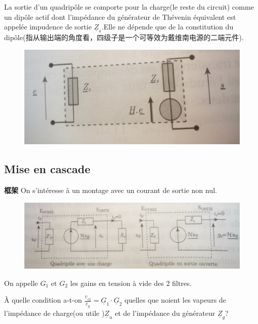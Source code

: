 \documentclass[12pt]{book}
\theoremstyle{definition}\newtheorem{dfn}{Définition}[chapter]
\theoremstyle{plain}\newtheorem{thm}{Théorème}[chapter]
\theoremstyle{plain}\newtheorem{prp}{Proposition}[chapter]
\theoremstyle{plain}\newtheorem{lem}{\bf Lemme}[chapter]
\theoremstyle{plain}\newtheorem{axm}{\bf Axiome}[chapter]
\theoremstyle{plain}\newtheorem{lmm}{\bf Lemme}[chapter]
\theoremstyle{plain}\newtheorem{cor}{\bf Corollaire}[chapter]
\theoremstyle{remark}\newtheorem{rem}{Remarque}[chapter]
\begin{document}
La sortie d'un quadripôle se comporte pour la charge(le reste du circuit) comme un dipôle actif dont l'impédance du générateur de Thévenin équivalent est appelée impudence de sortie $\underline{Z}_s$.Elle ne dépende que de la constitution du dipôle(指从输出端的角度看，四级子是一个可等效为戴维南电源的二端元件).
\begin{figure}[H]
	\centering
	\includegraphics[scale=0.15]{image//Filtrage//11}
\end{figure}
\subsection{Mise en cascade}
\begin{framed}{\textbf{框架}}
 On s'intéresse à un montage avec un courant de sortie non nul.
\end{framed}
\begin{figure}[H]
	\centering
	\includegraphics[scale=0.15]{image//Filtrage//12}
\end{figure}
On appelle $G_1$ et $G_2$ les gains en tension à vide des 2 filtres.
\begin{framed}
À quelle condition a-t-on $\frac{\underline{v}_{s2}}{\underline{e}_g}=\underline{G}_1\cdot\underline{G}_2$ {\color{red}quelles que noient} les vapeurs de l'impédance de charge(ou utile )$\underline{Z}_u$ et de l'impédance du générateur $\underline{Z}_g$?
\end{framed}
\end{document}
